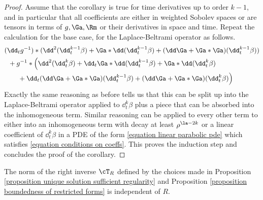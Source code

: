 \documentclass[hidelinks, 12pt, oneside, reqno]{amsart}
\begin{document}
\begin{proof}
Assume that the corollary is true for time derivatives up to order $k-1$, and in particular that all coefficients are either in weighted Sobolev spaces or are tensors in terms of $g,\Ga,\Rm$ or their derivatives in space and time. Repeat the calculation for the base case, for the Laplace-Beltrami operator as follows.
\begin{align*}
    &(\dd_t g^{-1}) * (\dd^2 (\dd_t^{k-1}\beta) + \Ga * \dd (\dd_t^{k-1}\beta) + (\dd \Ga + \Ga * \Ga) (\dd_t^{k-1}\beta)) \\
    &\;\;+ g^{-1} * \Big(\dd^2 (\dd_t^k \beta) + \dd_t \Ga * \dd (\dd_t^{k-1}\beta)+ \Ga * \dd (\dd_t^k \beta) \\
    &\qquad +  \dd_t(\dd \Ga + \Ga * \Ga) (\dd_t^{k-1}\beta) + (\dd \Ga + \Ga * \Ga) (\dd_t^k \beta)\Big)
\end{align*}
Exactly the same reasoning as before tells us that this can be split up into the Laplace-Beltrami operator applied to $\dd_t^k \beta$ plus a piece that can be absorbed into the inhomogeneous term. Similar reasoning can be applied to every other term to either into an inhomogeneous term with decay at least $\rho^{\la - 2k}$ or a linear coefficient of $\dd_t^k \beta$ in a PDE of the form \eqref{equation linear parabolic pde} which satisfies \eqref{equation conditions on coeffs}. This proves the induction step and concludes the proof of the corollary.
\end{proof}

\begin{prop}\label{proposition uniform boundedness of right inverse}
    The norm of the right inverse $\cT_R$ defined by the choices made in Proposition \ref{proposition unique solution sufficient regularity} and Proposition \ref{proposition boundedness of restricted forms} is independent of $R$.
\end{prop}
\end{document}
